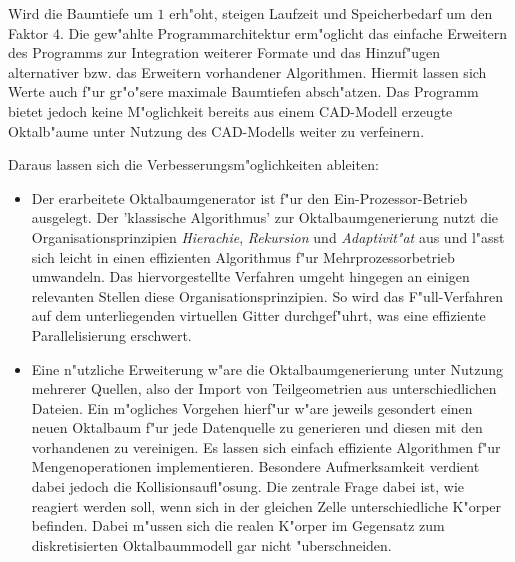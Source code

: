 Wird die Baumtiefe um $1$ erh"oht, steigen Laufzeit und Speicherbedarf um 
den Faktor $4$.
Die gew"ahlte Programmarchitektur erm"oglicht das 
einfache Erweitern des Programms zur Integration weiterer Formate und das 
Hinzuf"ugen alternativer bzw. das Erweitern vorhandener Algorithmen.
Hiermit 
lassen sich Werte auch f"ur gr"o"sere maximale Baumtiefen absch"atzen. 
Das Programm bietet jedoch keine M"oglichkeit bereits aus einem CAD-Modell 
erzeugte Oktalb"aume unter Nutzung des CAD-Modells weiter zu verfeinern.

Daraus lassen sich die Verbesserungsm"oglichkeiten ableiten: 
\begin{itemize}
\item Der erarbeitete Oktalbaumgenerator ist f"ur den Ein-Prozessor-Betrieb 
ausgelegt. Der 'klassische Algorithmus' zur Oktalbaumgenerierung nutzt die 
Organisationsprinzipien \emph{Hierachie}, \emph{Rekursion} und 
\emph{Adaptivit"at} aus und l"asst sich leicht in einen effizienten 
Algorithmus f"ur Mehrprozessorbetrieb umwandeln. Das hiervorgestellte 
Verfahren umgeht hingegen an einigen relevanten Stellen diese 
Organisationsprinzipien. So wird das F"ull-Verfahren auf dem unterliegenden 
virtuellen Gitter durchgef"uhrt, was eine effiziente Parallelisierung 
erschwert.
 
\item Eine n"utzliche Erweiterung w"are die Oktalbaumgenerierung unter Nutzung 
mehrerer Quellen, also der Import von Teilgeometrien aus unterschiedlichen 
Dateien. Ein m"ogliches Vorgehen hierf"ur w"are jeweils gesondert einen neuen 
Oktalbaum f"ur jede Datenquelle zu generieren und diesen mit den vorhandenen 
zu vereinigen. Es lassen sich einfach effiziente Algorithmen f"ur 
Mengenoperationen implementieren. Besondere Aufmerksamkeit verdient dabei 
jedoch die Kollisionsaufl"osung. Die zentrale Frage dabei ist, wie reagiert 
werden soll, wenn sich in der gleichen Zelle unterschiedliche K"orper 
befinden. Dabei m"ussen sich die realen K"orper im Gegensatz zum 
diskretisierten Oktalbaummodell gar nicht "uberschneiden.


\end{itemize}
